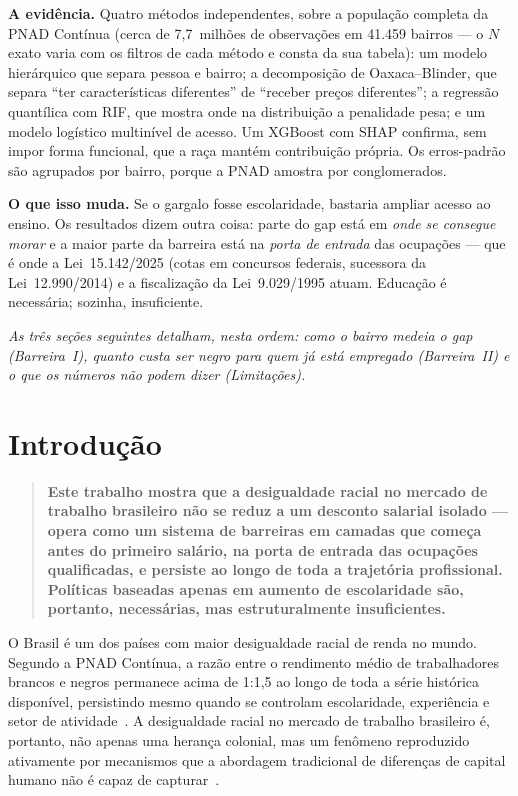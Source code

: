 \documentclass[12pt, a4paper, oneside]{article}
\begin{document}
\medskip
\noindent\textbf{A evidência.} Quatro métodos independentes, sobre a população completa da
PNAD Contínua (cerca de 7{,}7~milhões de observações em 41.459 bairros --- o $N$
exato varia com os filtros de cada método e consta da sua tabela): um modelo hierárquico que
separa pessoa e bairro; a decomposição de Oaxaca--Blinder, que separa ``ter
características diferentes'' de ``receber preços diferentes''; a regressão quantílica com
RIF, que mostra onde na distribuição a penalidade pesa; e um modelo logístico multinível
de acesso. Um XGBoost com SHAP confirma, sem impor forma funcional, que a raça mantém
contribuição própria. Os erros-padrão são agrupados por bairro, porque a PNAD amostra por
conglomerados.

\medskip
\noindent\textbf{O que isso muda.} Se o gargalo fosse escolaridade, bastaria ampliar
acesso ao ensino. Os resultados dizem outra coisa: parte do gap está em \emph{onde se
consegue morar} e a maior parte da barreira está na \emph{porta de entrada} das ocupações
--- que é onde a Lei~15.142/2025 (cotas em concursos federais, sucessora da
Lei~12.990/2014) e a fiscalização da Lei~9.029/1995 atuam. Educação é
necessária; sozinha, insuficiente.

\medskip
\noindent\textit{As três seções seguintes detalham, nesta ordem: como o bairro medeia o
gap (Barreira~I), quanto custa ser negro para quem já está empregado (Barreira~II) e o que
os números não podem dizer (Limitações).}

\section{Introdução}
\label{sec:intro}

\begin{quote}
\textbf{Este trabalho mostra que a desigualdade racial no mercado de trabalho
brasileiro não se reduz a um desconto salarial isolado --- opera como um
sistema de barreiras em camadas que começa antes do primeiro salário, na
porta de entrada das ocupações qualificadas, e persiste ao longo de toda a
trajetória profissional.
Políticas baseadas apenas em aumento de escolaridade são, portanto,
necessárias, mas estruturalmente insuficientes.}
\end{quote}

O Brasil é um dos países com maior desigualdade racial de renda no mundo.
Segundo a PNAD Contínua, a razão entre o rendimento médio de trabalhadores
brancos e negros permanece acima de 1{:}1,5 ao longo de toda a série
histórica disponível, persistindo mesmo quando se controlam escolaridade,
experiência e setor de atividade~\cite{ibge_pnad_2023}.
A desigualdade racial no mercado de trabalho brasileiro é, portanto,
não apenas uma herança colonial, mas um fenômeno reproduzido ativamente
por mecanismos que a abordagem tradicional de diferenças de capital humano
não é capaz de capturar~\cite{hasenbalg1979}.
\end{document}
